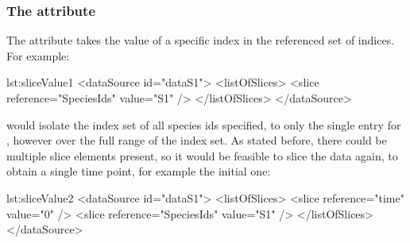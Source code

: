 \subsubsection{The  attribute}
\label{sec:sliceValue}
The  attribute takes the value of a specific index in the referenced set of indices. For example:

\begin{myXmlLst}{}{lst:sliceValue1}
        <dataSource id="dataS1">
          <listOfSlices>
            <slice reference="SpeciesIds" value="S1" />
          </listOfSlices>
        </dataSource>
\end{myXmlLst} 

would isolate the index set of all species ids specified, to only the single entry for , however over the full range of the  index set. As stated before, there could be multiple slice elements present, so it would be feasible to slice the data again, to obtain a single time point, for example the initial one:

\begin{myXmlLst}{}{lst:sliceValue2}
        <dataSource id="dataS1">
          <listOfSlices>
            <slice reference="time" value="0" />
            <slice reference="SpeciesIds" value="S1" />
          </listOfSlices>
        </dataSource>
\end{myXmlLst} 


